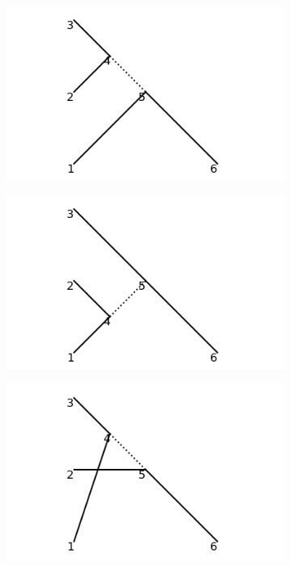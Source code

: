 \documentclass[11pt,a4paper,twoside,pdf]{article}
\numberwithin{equation}{section}
\begin{document}
\begin{figure}[h!]
    \centering
    \begin{subfigure}[t]{0.33\textwidth}
        \centering
        \includegraphics[width=\textwidth]{plots/canonical/order2/1.png}
        \caption{ }
    \end{subfigure}%
    \begin{subfigure}[t]{0.33\textwidth}
        \centering
        \includegraphics[width=\textwidth]{plots/canonical/order2/2.png}
        \caption{ }
    \end{subfigure}
    \begin{subfigure}[t]{0.33\textwidth}
        \centering
        \includegraphics[width=\textwidth]{plots/canonical/order2/3.png}

\end{subfigure}
\end{figure}
\end{document}
